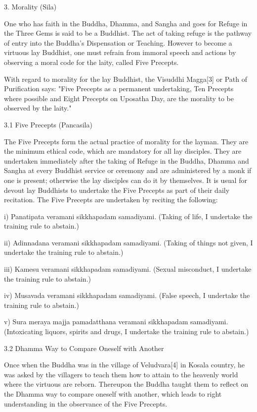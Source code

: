 3. Morality (Sila)

One who has faith in the Buddha, Dhamma, and Sangha and goes for Refuge in the Three Gems is said to be a Buddhist. The act of taking refuge is the pathway of entry into the Buddha's Dispensation or Teaching. However to become a virtuous lay Buddhist, one must refrain from immoral speech and actions by observing a moral code for the laity, called Five Precepts.

With regard to morality for the lay Buddhist, the Visuddhi Magga[3] or Path of Purification says: "Five Precepts as a permanent undertaking, Ten Precepts where possible and Eight Precepts on Uposatha Day, are the morality to be observed by the laity."

3.1 Five Precepts (Pancasila)

The Five Precepts form the actual practice of morality for the layman. They are the minimum ethical code, which are mandatory for all lay disciples. They are undertaken immediately after the taking of Refuge in the Buddha, Dhamma and Sangha at every Buddhist service or ceremony and are administered by a monk if one is present; otherwise the lay disciples can do it by themselves. It is usual for devout lay Buddhists to undertake the Five Precepts as part of their daily recitation. The Five Precepts are undertaken by reciting the following:

i) Panatipata veramani sikkhapadam samadiyami. (Taking of life, I undertake the training rule to abstain.)

ii) Adinnadana veramani sikkhapadam samadiyami. (Taking of things not given, I undertake the training rule to abstain.)

iii) Kamesu veramani sikkhapadam samadiyami. (Sexual misconduct, I undertake the training rule to abstain.)

iv) Musavada veramani sikkhapadam samadiyami. (False speech, I undertake the training rule to abstain.)

v) Sura meraya majja pamadatthana veramani sikkhapadam samadiyami. (Intoxicating liquors, spirits and drugs, I undertake the training rule to abstain.)

3.2 Dhamma Way to Compare Oneself with Another

Once when the Buddha was in the village of Veludvara[4] in Kosala country, he was asked by the villagers to teach them how to attain to the heavenly world where the virtuous are reborn. Thereupon the Buddha taught them to reflect on the Dhamma way to compare oneself with another, which leads to right understanding in the observance of the Five Precepts.

